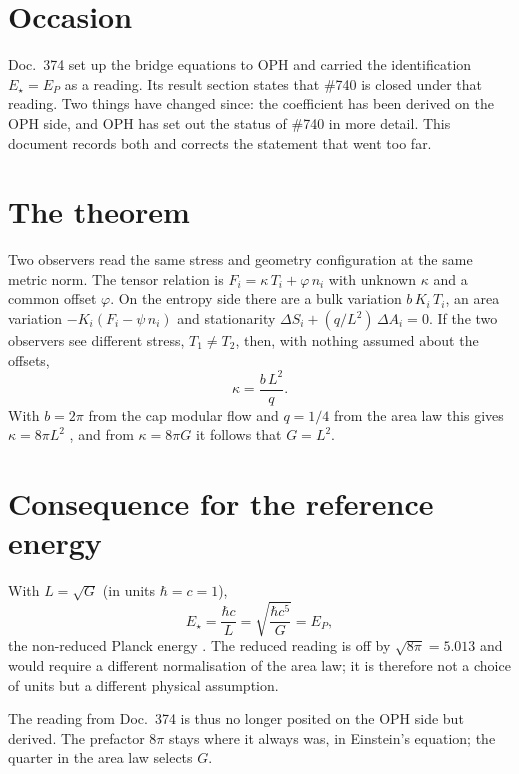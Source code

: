 \section{Occasion}

Doc.~374 set up the bridge equations to OPH and carried the identification
$E_\star=E_P$ as a reading. Its result section states that \#740 is closed
under that reading. Two things have changed since: the coefficient has been
derived on the OPH side, and OPH has set out the status of \#740 in more
detail. This document records both and corrects the statement that went too
far.

\section{The theorem \QM}

Two observers read the same stress and geometry configuration at the same
metric norm. The tensor relation is $F_i=\kappa\,T_i+\varphi\,n_i$ with unknown
$\kappa$ and a common offset $\varphi$. On the entropy side there are a bulk
variation $b\,K_i\,T_i$, an area variation $-K_i(F_i-\psi\,n_i)$ and
stationarity $\Delta S_i+(q/L^2)\,\Delta A_i=0$. If the two observers see
different stress, $T_1\neq T_2$, then, with nothing assumed about the offsets,
\begin{equation}
  \kappa=\frac{b\,L^2}{q}.
\end{equation}
With $b=2\pi$ from the cap modular flow and $q=1/4$ from the area law this
gives $\kappa=8\pi L^2$ \KM, and from $\kappa=8\pi G$ it follows that $G=L^2$.

\section{Consequence for the reference energy}

With $L=\sqrt G$ (in units $\hbar=c=1$),
\begin{equation}
  E_\star=\frac{\hbar c}{L}=\sqrt{\frac{\hbar c^5}{G}}=E_P ,
\end{equation}
the non-reduced Planck energy \BM. The reduced reading is off by
$\sqrt{8\pi}=5.013$ and would require a different normalisation of the area
law; it is therefore not a choice of units but a different physical
assumption.

The reading from Doc.~374 is thus no longer posited on the OPH side but
derived. The prefactor $8\pi$ stays where it always was, in Einstein's
equation; the quarter in the area law selects $G$.

